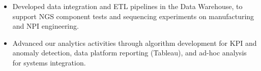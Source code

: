 \documentclass[10pt,a4paper]{altacv}
\begin{document}
\medskip



\begin{itemize}
    \item   \small{Developed data integration and ETL pipelines in the Data Warehouse, to support NGS component tests and sequencing experiments on manufacturing and NPI engineering.}
    \item   \small{Advanced our analytics activities through algorithm  development for KPI and anomaly detection, data platform reporting (Tableau), and ad-hoc analysis for systems integration.}
\end{itemize}

\medskip



\end{document}
